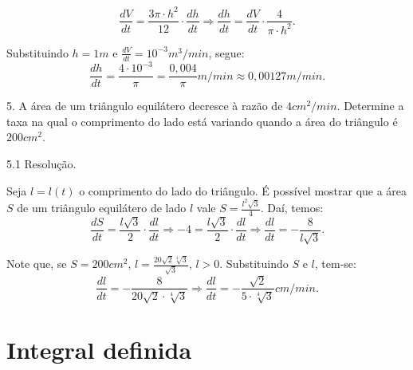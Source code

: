 \documentclass{article}
\begin{document}
{\begin{newpage}
\begin{equation*}\displaystyle{\frac{dV}{dt} = \frac{3\pi\cdot h^2}{12}\cdot\frac{dh}{dt} \Rightarrow \frac{dh}{dt} = \frac{dV}{dt}\cdot\frac{4}{\pi\cdot h^2}}.\end{equation*}
\par Substituindo $h=1m$ e $\displaystyle{\frac{dV}{dt} = 10^{-3}m^{3}/min}$, segue:
\begin{equation*}\displaystyle{\frac{dh}{dt} = \frac{4\cdot 10^{-3}}{\pi } = \frac{0,004}{\pi }m/min \approx 0,00127 m/min}.\end{equation*}
\par
\vspace{0.3cm}
\begin{flushleft}
5. A área de um triângulo equilátero decresce à razão de $4cm^{2}/min$. Determine a taxa na qual o comprimento do lado está variando quando a área do triângulo é $200cm^{2}$.
\end{flushleft}
\par
\vspace{0.3cm}
\begin{flushleft}
5.1 Resolução.
\end{flushleft}
\par Seja $l=l(t)$ o comprimento do lado do triângulo. É possível mostrar que a área $S$ de um triângulo equilátero de lado $l$ vale $S=\displaystyle{\frac{l^{2}\sqrt{3}}{4}}$. Daí, temos:
\begin{equation*} \displaystyle{\frac{dS}{dt} = \frac{l\sqrt{3}}{2}\cdot\frac{dl}{dt} \Rightarrow -4 = \frac{l\sqrt{3}}{2}\cdot\frac{dl}{dt}\Rightarrow \frac{dl}{dt} = -\frac{8}{l\sqrt{3}}}.\end{equation*}
\par Note que, se $S=200cm^{2}$, $l=\displaystyle{\frac{20\sqrt{2}\sqrt[4]{3}}{\sqrt{3}}}$, $l>0$. Substituindo $S$ e $l$, tem-se:
\begin{equation*}\displaystyle{\frac{dl}{dt} = -\frac{8}{20\sqrt{2}\cdot\sqrt[4]{3}} \Rightarrow \frac{dl}{dt} = -\frac{\sqrt{2}}{5\cdot\sqrt[4]{3}}cm/min}.\end{equation*}
\par
\vspace{0.3cm}
\section{Integral definida}

\end{newpage}}
\end{document}
